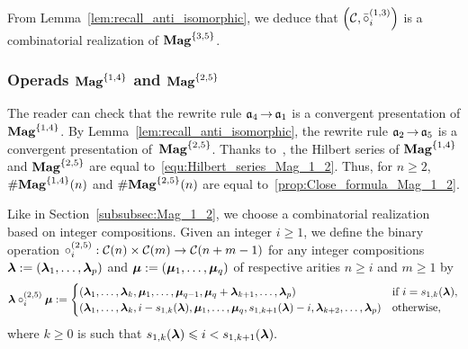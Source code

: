 From Lemma~\ref{lem:recall_anti_isomorphic}, we deduce that
$\left(\mathcal{C}, \bar{\circ}_i^{(1,3)}\right)$ is a combinatorial
realization of $\mathbf{Mag}^{\{3, 5\}}$.
\medbreak

\subsubsection{Operads $\mathbf{Mag}^{\{1, 4\}}$ and $\mathbf{Mag}^{\{2, 5\}}$}
The reader can check that the rewrite rule $\mathfrak{a}_4 \operatorname{\to} \mathfrak{a}_1$ is a
convergent presentation of $\mathbf{Mag}^{\{1, 4\}}$. By
Lemma~\ref{lem:recall_anti_isomorphic}, the rewrite rule
$\mathfrak{a}_2 \operatorname{\to} \mathfrak{a}_5$ is a convergent presentation of~$\mathbf{Mag}^{\{2, 5\}}$.
Thanks to~\cite{Gir18}, the Hilbert series of $\mathbf{Mag}^{\{1, 4\}}$ and
$\mathbf{Mag}^{\{2, 5\}}$ are equal to~\eqref{equ:Hilbert_series_Mag_1_2}. Thus,
for $n \geq 2$, $\# \mathbf{Mag}^{\{1, 4\}}(n)$ and $\# \mathbf{Mag}^{\{2, 5\}}(n)$ are
equal to~\eqref{prop:Close_formula_Mag_1_2}.
\medbreak

Like in Section~\ref{subsubsec:Mag_1_2}, we choose a combinatorial
realization based on integer compositions. Given an integer $i \geq 1$,
we define the binary operation
\begin{math}
    \circ_i^{(2,5)} : \mathcal{C}(n) \times \mathcal{C}(m)
    \to\mathcal{C}(n + m - 1)
\end{math}
for any integer compositions
$\bm{\lambda} := \left(\bm{\lambda}_1, \dots, \bm{\lambda}_p\right)$ and
$\bm{\mu} := \left(\bm{\mu}_1, \dots, \bm{\mu}_q\right)$ of respective arities
$n \geq i$ and $m \geq 1$ by
\begin{equation}
    \bm{\lambda} \circ_i^{(2,5)} \bm{\mu} :=
    \begin{cases}
        \left(\bm{\lambda}_1, \dots, \bm{\lambda}_k,
        \bm{\mu}_1, \dots, \bm{\mu}_{q-1}, \bm{\mu}_q+
        \bm{\lambda}_{k + 1}, \dots, \bm{\lambda}_p\right)
            & \mbox{if } i = s_{1, k}(\bm{\lambda}), \\
        \left(\bm{\lambda}_1, \dots, \bm{\lambda}_k,
        i - s_{1, k}(\bm{\lambda}), \bm{\mu}_1, \dots,
        \bm{\mu}_q, s_{1, k+1}(\bm{\lambda}) - i, \bm{\lambda}_{k + 2}, \dots,
        \bm{\lambda}_p
        \right)
            & \mbox{otherwise},
    \end{cases}
\end{equation}
where $k \geq 0$ is such that
\begin{math}
    s_{1, k}(\bm{\lambda}) \leqslant i < s_{1, k + 1}(\bm{\lambda}).
\end{math}
\medbreak

